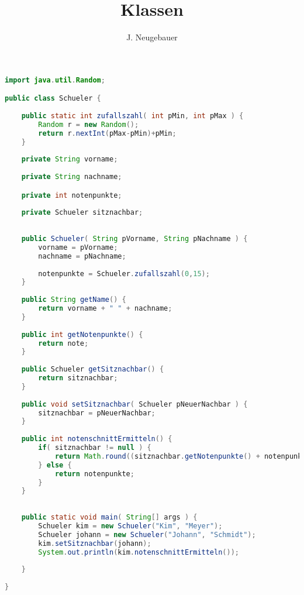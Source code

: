 \documentclass[10pt, a4paper, landscape, twocolumn]{scrartcl}
\author{J. Neugebauer}
\title{Klassen}
\date{\Heute}
\begin{document}
\begin{lstlisting}[language=Java,frame=none]
import java.util.Random;

public class Schueler {
	
	public static int zufallszahl( int pMin, int pMax ) {
		Random r = new Random();
		return r.nextInt(pMax-pMin)+pMin;
	}	
	
	private String vorname;
	
	private String nachname;

	private int notenpunkte;
	
	private Schueler sitznachbar;
	
	
	public Schueler( String pVorname, String pNachname ) {
		vorname = pVorname;
		nachname = pNachname;
		
		notenpunkte = Schueler.zufallszahl(0,15);
	}
	
	public String getName() {
		return vorname + " " + nachname;
	}
	
	public int getNotenpunkte() {
		return note;
	}
	
	public Schueler getSitznachbar() {
		return sitznachbar;
	}
	
	public void setSitznachbar( Schueler pNeuerNachbar ) {
		sitznachbar = pNeuerNachbar;
	}
	
	public int notenschnittErmitteln() {
		if( sitznachbar != null ) {
			return Math.round((sitznachbar.getNotenpunkte() + notenpunkte)/2);
		} else {
			return notenpunkte;
		}
	}
	
	
	public static void main( String[] args ) {
		Schueler kim = new Schueler("Kim", "Meyer");
		Schueler johann = new Schueler("Johann", "Schmidt");
		kim.setSitznachbar(johann);
		System.out.println(kim.notenschnittErmitteln());
		
	}
	
}
\end{lstlisting}
\end{document}
